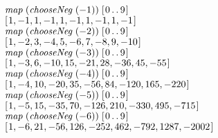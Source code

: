 \documentclass[tikz]{scrreprt}
\newcommand{\Varid}[1]{\mathit{#1}}
\begin{document}
\ensuremath{\Varid{map}\;(\Varid{chooseNeg}\;(\mathbin{-}\mathrm{1}))\;[\mskip1.5mu \mathrm{0}\mathinner{\ldotp\ldotp}\mathrm{9}\mskip1.5mu]}\\
\ensuremath{[\mskip1.5mu \mathrm{1},\mathbin{-}\mathrm{1},\mathrm{1},\mathbin{-}\mathrm{1},\mathrm{1},\mathbin{-}\mathrm{1},\mathrm{1},\mathbin{-}\mathrm{1},\mathrm{1},\mathbin{-}\mathrm{1}\mskip1.5mu]}\\[12pt]
\ensuremath{\Varid{map}\;(\Varid{chooseNeg}\;(\mathbin{-}\mathrm{2}))\;[\mskip1.5mu \mathrm{0}\mathinner{\ldotp\ldotp}\mathrm{9}\mskip1.5mu]}\\
\ensuremath{[\mskip1.5mu \mathrm{1},\mathbin{-}\mathrm{2},\mathrm{3},\mathbin{-}\mathrm{4},\mathrm{5},\mathbin{-}\mathrm{6},\mathrm{7},\mathbin{-}\mathrm{8},\mathrm{9},\mathbin{-}\mathrm{10}\mskip1.5mu]}\\[12pt]
\ensuremath{\Varid{map}\;(\Varid{chooseNeg}\;(\mathbin{-}\mathrm{3}))\;[\mskip1.5mu \mathrm{0}\mathinner{\ldotp\ldotp}\mathrm{9}\mskip1.5mu]}\\
\ensuremath{[\mskip1.5mu \mathrm{1},\mathbin{-}\mathrm{3},\mathrm{6},\mathbin{-}\mathrm{10},\mathrm{15},\mathbin{-}\mathrm{21},\mathrm{28},\mathbin{-}\mathrm{36},\mathrm{45},\mathbin{-}\mathrm{55}\mskip1.5mu]}\\[12pt]
\ensuremath{\Varid{map}\;(\Varid{chooseNeg}\;(\mathbin{-}\mathrm{4}))\;[\mskip1.5mu \mathrm{0}\mathinner{\ldotp\ldotp}\mathrm{9}\mskip1.5mu]}\\
\ensuremath{[\mskip1.5mu \mathrm{1},\mathbin{-}\mathrm{4},\mathrm{10},\mathbin{-}\mathrm{20},\mathrm{35},\mathbin{-}\mathrm{56},\mathrm{84},\mathbin{-}\mathrm{120},\mathrm{165},\mathbin{-}\mathrm{220}\mskip1.5mu]}\\[12pt]
\ensuremath{\Varid{map}\;(\Varid{chooseNeg}\;(\mathbin{-}\mathrm{5}))\;[\mskip1.5mu \mathrm{0}\mathinner{\ldotp\ldotp}\mathrm{9}\mskip1.5mu]}\\
\ensuremath{[\mskip1.5mu \mathrm{1},\mathbin{-}\mathrm{5},\mathrm{15},\mathbin{-}\mathrm{35},\mathrm{70},\mathbin{-}\mathrm{126},\mathrm{210},\mathbin{-}\mathrm{330},\mathrm{495},\mathbin{-}\mathrm{715}\mskip1.5mu]}\\[12pt]
\ensuremath{\Varid{map}\;(\Varid{chooseNeg}\;(\mathbin{-}\mathrm{6}))\;[\mskip1.5mu \mathrm{0}\mathinner{\ldotp\ldotp}\mathrm{9}\mskip1.5mu]}\\
\ensuremath{[\mskip1.5mu \mathrm{1},\mathbin{-}\mathrm{6},\mathrm{21},\mathbin{-}\mathrm{56},\mathrm{126},\mathbin{-}\mathrm{252},\mathrm{462},\mathbin{-}\mathrm{792},\mathrm{1287},\mathbin{-}\mathrm{2002}\mskip1.5mu]}
\end{document}
